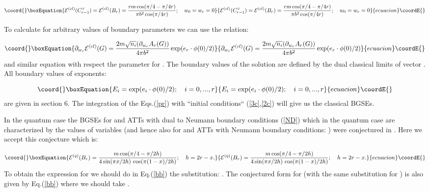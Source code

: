 \documentclass[a4paper,12pt,titlepage,final]{article}
\begin{document}
\begin{equation}\coord{}\boxEquation{
\mathcal{E}^{(cl)}(C_{r-1}^{\vee })=\mathcal{E}^{(cl)}(B_{r})=\frac{rm\cos
(\pi /4-\pi /4r)}{\pi b^{2}\cos (\pi /4r)};\quad w_{0}=w_{r}=0  \label{2c}
}{
\mathcal{E}^{(cl)}(C_{r-1}^{\vee })=\mathcal{E}^{(cl)}(B_{r})=\frac{rm\cos
(\pi /4-\pi /4r)}{\pi b^{2}\cos (\pi /4r)};\quad w_{0}=w_{r}=0  }{ecuacion}\coordE{}\end{equation}

To calculate \coordHE{} for arbitrary values of boundary
parameters we can use the relation:

\begin{equation}\coord{}\boxEquation{
\partial _{w_{r}}\mathcal{E}^{(cl)}(G)=\frac{2m\sqrt{n_{i}}(\partial
_{w_{r}}A_{r}(G))}{4\pi b^{2}}\exp (e_{r}\cdot \phi (0)/2)  \label{pr}
}{
\partial _{w_{r}}\mathcal{E}^{(cl)}(G)=\frac{2m\sqrt{n_{i}}(\partial
_{w_{r}}A_{r}(G))}{4\pi b^{2}}\exp (e_{r}\cdot \phi (0)/2)  }{ecuacion}\coordE{}\end{equation}
and similar equation with respect the parameter \coordHE{} for
\coordHE{}.
The boundary values \coordHE{} of the solution are
defined by the dual classical limits of vector \coordHE{}. All
boundary values of exponents:

\begin{equation}\coord{}\boxEquation{
E_{i}=\exp (e_{i}\cdot \phi (0)/2);\quad i=0,...,r  \label{ei}
}{
E_{i}=\exp (e_{i}\cdot \phi (0)/2);\quad i=0,...,r  }{ecuacion}\coordE{}\end{equation}
are given in section 6. The integration of the Eqs.(\ref{pr}) with ``initial
conditions`` (\ref{3c},\ref{2c}) will give us the classical BGSEs.

In the quantum case the BGSEs for \coordHE{} and \coordHE{} ATTs with dual
to Neumann boundary conditions (\ref{ND}) which in the quantum case are
characterized by the values of variables \coordHE{} (and hence also
for \coordHE{} and \coordHE{} ATTs with Neumann boundary conditions:
\coordHE{}) were conjectured in \cite{FO}. Here we accept this
conjecture which is:

\begin{equation}\coord{}\boxEquation{
\mathcal{E}^{(q)}(B_{r})=\frac{m\cos (\pi /4-\pi /2h)}{4\sin (\pi x/2h)
\,\cos(\pi (1-x)/2h)};\quad h=2r-x.  \label{bb}
}{
\mathcal{E}^{(q)}(B_{r})=\frac{m\cos (\pi /4-\pi /2h)}{4\sin (\pi x/2h)
\,\cos(\pi (1-x)/2h)};\quad h=2r-x.  }{ecuacion}\coordE{}\end{equation}
To obtain the expression for \coordHE{} we should do
in Eq.(\ref{bb}) the substitution: \coordHE{}. The conjectured form
for \coordHE{} (with the same substitution for
\coordHE{}) is also given by Eq.(\ref{bb}) where we should
take \coordHE{}.
\end{document}
